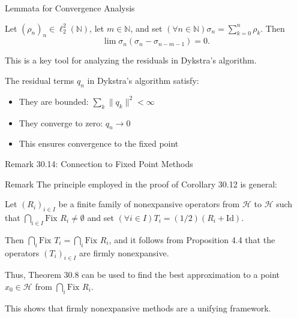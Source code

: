 \documentclass[aspectratio=169,10pt]{beamer}
\newenvironment{remark}
  {\begin{block}{Remark}}
  {\end{block}}
\begin{document}
\begin{frame}{Lemmata for Convergence Analysis}
  \begin{lemma}
    Let $(\rho_n)_n \in \ell_2^2(\mathbb{N})$, let $m \in \mathbb{N}$, and set $(\forall n \in \mathbb{N}) \sigma_n = \sum_{k=0}^{n} \rho_k$. Then
    \[
      \lim \sigma_n(\sigma_n - \sigma_{n-m-1}) = 0.
    \]
  \end{lemma}

  \vspace{0.3cm}

  This is a key tool for analyzing the residuals in Dykstra's algorithm.

  \vspace{0.3cm}

  \begin{lemma}
    The residual terms $q_n$ in Dykstra's algorithm satisfy:
    \begin{itemize}
      \item They are bounded: $\sum_k \|q_k\|^2 < \infty$
      \item They converge to zero: $q_n \to 0$
      \item This ensures convergence to the fixed point
    \end{itemize}
  \end{lemma}
\end{frame}


\begin{frame}{Remark 30.14: Connection to Fixed Point Methods}
  \begin{remark}
    The principle employed in the proof of Corollary 30.12 is general:

    Let $(R_i)_{i \in I}$ be a finite family of nonexpansive operators from $\mathcal{H}$ to $\mathcal{H}$ such that $\bigcap_{i \in I} \text{Fix } R_i \neq \emptyset$ and set $(\forall i \in I) T_i = (1/2)(R_i + \text{Id})$.

    Then $\bigcap_i \text{Fix } T_i = \bigcap_i \text{Fix } R_i$, and it follows from Proposition 4.4 that the operators $(T_i)_{i \in I}$ are firmly nonexpansive.

    Thus, Theorem 30.8 can be used to find the best approximation to a point $x_0 \in \mathcal{H}$ from $\bigcap_i \text{Fix } R_i$.
  \end{remark}

  \vspace{0.3cm}

  This shows that firmly nonexpansive methods are a unifying framework.
\end{frame}
\end{document}
